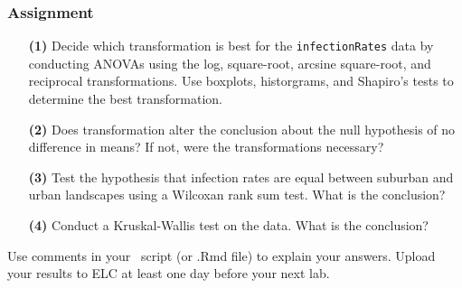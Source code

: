 \documentclass[color=usenames,dvipsnames]{beamer}\usepackage[]{graphicx}\usepackage[]{color}
\newcommand{\inr}[1]{\colorbox{inlinecolor}{\texttt{#1}}}
\begin{document}
\begin{frame}
  \frametitle{Assignment}
  \small
  \begin{enumerate}
    \item[\bf (1)] Decide which transformation is best for the
      \inr{infectionRates} data by conducting ANOVAs using the log,
      square-root, arcsine square-root, and reciprocal
      transformations. Use boxplots, historgrams, and Shapiro's tests
      to determine the best transformation.
    \item[\bf (2)] Does transformation alter the conclusion about the
      null hypothesis of no difference in means? If not, were the
      transformations necessary?
    \item[\bf (3)] Test the hypothesis that infection rates are equal
      between suburban and urban landscapes using a Wilcoxan rank sum
      test. What is the conclusion?
    \item[\bf (4)] Conduct a Kruskal-Wallis test on the data. What
      is the conclusion? %
  \end{enumerate}
  \vfill
  Use comments in your \R~script (or .Rmd file) to explain your
  answers. Upload your results to ELC at least one day before your
  next lab.\\ 
\end{frame}
\end{document}
